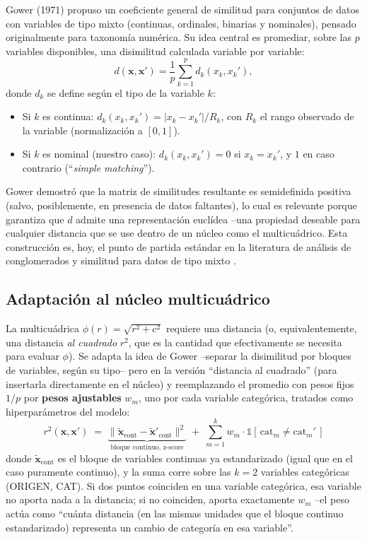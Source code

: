 \documentclass[11pt,a4paper]{article}
\begin{document}
Gower (1971) \cite{gower1971} propuso un coeficiente general de similitud
para conjuntos de datos con variables de tipo mixto (continuas, ordinales,
binarias y nominales), pensado originalmente para taxonom\'ia num\'erica.
Su idea central es promediar, sobre las $p$ variables disponibles, una
disimilitud calculada variable por variable:
\[
d(\mathbf x, \mathbf x') = \frac{1}{p}\sum_{k=1}^{p} d_k(x_k, x_k'),
\]
donde $d_k$ se define seg\'un el tipo de la variable $k$:
\begin{itemize}[nosep]
    \item Si $k$ es continua: $d_k(x_k,x_k') = |x_k-x_k'|/R_k$, con $R_k$ el
    rango observado de la variable (normalizaci\'on a $[0,1]$).
    \item Si $k$ es nominal (nuestro caso): $d_k(x_k,x_k')=0$ si
    $x_k=x_k'$, y $1$ en caso contrario (``\emph{simple matching}'').
\end{itemize}
Gower demostr\'o que la matriz de similitudes resultante es semidefinida
positiva (salvo, posiblemente, en presencia de datos faltantes), lo cual es
relevante porque garantiza que $d$ admite una representaci\'on eucl\'idea
--una propiedad deseable para cualquier distancia que se use dentro de un
n\'ucleo como el multicu\'adrico. Esta construcci\'on es, hoy, el punto de
partida est\'andar en la literatura de an\'alisis de conglomerados y
similitud para datos de tipo mixto \cite{gower1986}.

\subsection{Adaptaci\'on al n\'ucleo multicu\'adrico}

La multicu\'adrica $\phi(r)=\sqrt{r^2+c^2}$ requiere una distancia (o,
equivalentemente, una distancia \emph{al cuadrado} $r^2$, que es la cantidad
que efectivamente se necesita para evaluar $\phi$). Se adapta la idea de
Gower --separar la disimilitud por bloques de variables, seg\'un su tipo--
pero en la versi\'on ``distancia al cuadrado'' (para insertarla directamente
en el n\'ucleo) y reemplazando el promedio con pesos fijos $1/p$ por
\textbf{pesos ajustables} $w_m$, uno por cada variable categ\'orica, tratados
como hiperpar\'ametros del modelo:
\[
\boxed{\;
r^2(\mathbf x,\mathbf x') \;=\; \underbrace{\lVert \tilde{\mathbf x}_{\text{cont}}
- \tilde{\mathbf x}'_{\text{cont}}\rVert^2}_{\text{bloque continuo, z-score}}
\;+\; \sum_{m=1}^{k} w_m \cdot \mathbb{1}\!\left[\,\text{cat}_m \neq \text{cat}_m'\,\right]
\;}
\]
donde $\tilde{\mathbf x}_{\text{cont}}$ es el bloque de variables continuas
ya estandarizado (igual que en el caso puramente continuo), y la suma corre
sobre las $k=2$ variables categ\'oricas (ORIGEN, CAT). Si dos puntos
coinciden en una variable categ\'orica, esa variable no aporta nada a la
distancia; si no coinciden, aporta exactamente $w_m$ --el peso act\'ua como
``cu\'anta distancia (en las mismas unidades que el bloque continuo
estandarizado) representa un cambio de categor\'ia en esa variable''.
\end{document}
